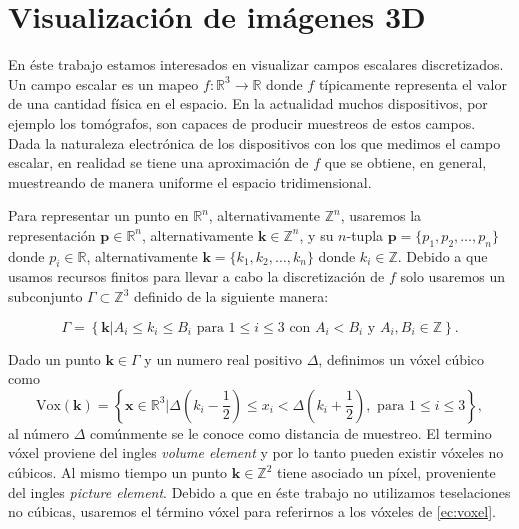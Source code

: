 \chapter{Visualización de imágenes 3D}
\label{chap:visualizaImagenes}
En éste trabajo estamos interesados en visualizar campos escalares discretizados. Un campo escalar es un mapeo $f:\mathbb{R}^3 \rightarrow \mathbb{R}$ donde $f$ típicamente representa el valor de una cantidad física en el espacio. En la actualidad muchos dispositivos, por ejemplo los tomógrafos, son capaces de producir muestreos de estos campos. Dada la naturaleza electrónica de los dispositivos con los que medimos el campo escalar, en realidad se tiene una aproximación de $f$ que se obtiene, en general, muestreando de manera uniforme el espacio tridimensional. 

Para representar un punto en $\mathbb{R}^n$, alternativamente $\mathbb{Z}^n$, usaremos la representación $\textbf{p} \in \mathbb{R}^n$, alternativamente $\textbf{k} \in \mathbb{Z}^n$, y su $n$-tupla $\textbf{p} = \{ p_1, p_2,\ldots, p_n \}$ donde $p_i \in \mathbb{R}$, alternativamente $\textbf{k} = \{ k_1, k_2,\ldots, k_n \}$ donde $k_i \in \mathbb{Z}$. Debido a que usamos recursos finitos para llevar a cabo la discretización de $f$ solo usaremos un subconjunto $\Gamma \subset \mathbb{Z}^3$ definido de la siguiente manera:

\begin{equation}
\Gamma = \left\lbrace \textbf{k} | A_i \leq k_i \leq B_i \text{ para } 1 \leq i \leq 3 \text{ con } A_i < B_i \text{ y } A_i, B_i \in \mathbb{Z} \right\rbrace 
 \label{ec:escena}.
\end{equation}

Dado un punto $\textbf{k} \in \Gamma$ y un numero real positivo $\Delta$, definimos un vóxel cúbico como 
\begin{equation}
   \text{Vox} (\textbf{k}) = \left\lbrace \textbf{x} \in \mathbb{R}^3 | \Delta \left(  k_i - \dfrac{1}{2} \right) \leq x_i < \Delta \left(  k_i + \dfrac{1}{2} \right)  , \text{ para } 1 \leq i \leq 3 \right\rbrace 
  \label{ec:voxel},
\end{equation}al número $\Delta$ comúnmente se le conoce como distancia de muestreo\cite{edgarReconstruction}. El termino vóxel proviene del ingles \emph{volume element} y por lo tanto pueden existir vóxeles no cúbicos. Al mismo tiempo un punto $\textbf{k} \in \mathbb{Z}^2$ tiene asociado un píxel, proveniente del ingles \emph{picture element}. Debido a que en éste trabajo no utilizamos teselaciones no cúbicas, usaremos el término vóxel para referirnos a los vóxeles de \eqref{ec:voxel}.


